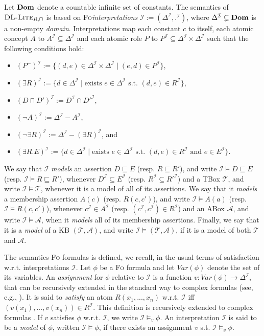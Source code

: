 \documentclass[11pt]{llncs}
\newcommand{\e}[1]{{\bf #1}}
\newcommand{\logic}[1]{\textsc{#1}\xspace}
\newcommand{\FOL}{\logic{Fo}}
\newcommand{\domain}{\Delta^{\inte}}
\newcommand{\Var}[1]{\textit{Var}(#1)}
\newcommand{\g}[1]{\logic{#1}}
\newcommand{\inte}{\f{I}}
\newcommand{\tup}[1]{(#1)}
\newcommand{\set}[1]{\{#1\}}
\newcommand{\f}[1]{\mathcal{#1}}
\newcommand{\dlliterc}{\g{DL-Lite}_{R,\sqcap}\xspace}
\begin{document}
Let $\e{Dom}$ denote a countable infinite set of constants.
The semantics of $\dlliterc$
is based on \FOL\xspace {\em interpretations} $\inte := 
\tup{\domain, .^{\inte}}$, where
$\domain \subsetneq \e{Dom}$ is a non-empty {\em domain}.
Interpretations map each constant $c$ to itself,
each atomic concept $A$ to $A^{\inte} \subseteq \domain$
and each atomic role $P$ to $P^{\inte} \subseteq \domain \times \domain$
such that the following conditions hold:
\begin{itemize}
\item $(P^-)^{\inte} := \set{\tup{d, e} \in \domain \times \domain \mid 
\tup{e, d} \in P^{\inte}}$,
\item $(\exists R)^{\inte} := \set{d \in \domain \mid \text{exists } e \in \domain \text{ s.t. } 
\tup{d, e} \in R^{\inte}}$, 
\item $(D \sqcap D')^{\inte} := D^{\inte} \cap D'^{\inte}$,
\item $(\neg A)^{\inte} := \domain - A^{\inte}$,
\item $(\neg \exists R)^{\inte} := \domain - (\exists R)^{\inte}$, and
\item $(\exists R . E)^{\inte} := \set{d \in \domain 
\mid \text{exists } e \in \domain \text{ s.t. } \tup{d, e}
\in R^{\inte} \text{ and } e \in E^{\inte}}$.
\end{itemize}

We say that $\inte$ {\em models} an assertion $D \sqsubseteq E$ (resp. $R \sqsubseteq R'$),
and write $\inte \models D \sqsubseteq E$ (resp. $\inte \models R \sqsubseteq R'$),
whenever $D^{\inte} \subseteq E^{\inte}$ (resp. $R^{\inte} \subseteq R'^{\inte}$)
and a TBox
$\f{T}$, and write $\inte \models \f{T}$, whenever it is a model of all of its
assertions. We say that it {\em models} a membership assertion
$A(c)$ (resp. $R(c,c')$), and write $\inte \models A(a)$ (resp. $\inte \models R(c,c')$), 
whenever $c^{\inte} \in A^{\inte}$
(resp. $\tup{c^{\inte},c^{\inte}} \in R^{\inte}$) 
and an ABox $\f{A}$, and write $\inte \models \f{A}$,
when it {\em models} all of its membership assertions.
Finally, we say that it is a {\em model} of a KB $\tup{\f{T}, \f{A}}$,
and write $\inte \models \tup{\f{T}, \f{A}}$,
if it is a model of both $\f{T}$ and $\f{A}$.

The semantics \FOL formulas
is defined, we recall, in the usual terms
of satisfaction w.r.t. interpretations $\f{I}$.
Let $\phi$ be a \FOL formula and let
$\Var{\phi}$ denote the set of its variables.
An {\em assignment} 
for $\phi$ relative to $\inte$ is a
function $v \colon \Var{\phi} \to \domain$,
that can be recursively extended in the standard
way to complex formulas (see, e.g., \cite{CoriLascar}).
It is said to {\em satisfy} an atom $R(x_1,...,x_n)$ w.r.t. $\inte$
iff $\tup{v(x_1),...,v(x_n)} \in R^{\f{I}}$. This definition
is recursively extended
to complex formulas \cite{CoriLascar}. If $v$ satisfies $\phi$ w.r.t. $\inte$,
we write $\inte \models_v \phi$.
An interpretation $\inte$ is said to be a {\em model} of
$\phi$, written $\inte \models \phi$, 
if there exists an assignment $v$ s.t. $\inte \models_v \phi$.
\end{document}
